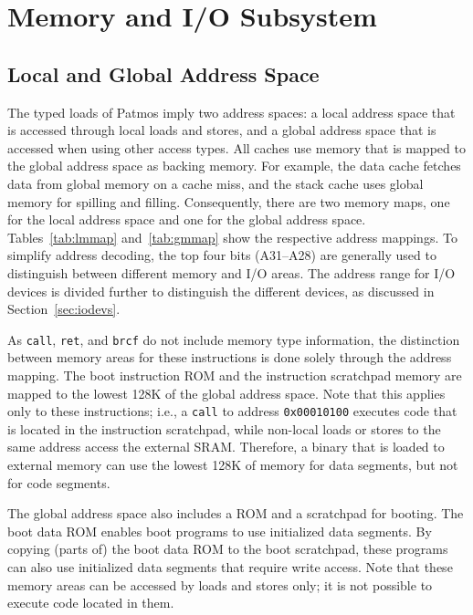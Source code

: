 \documentclass[a4paper,fontsize=10pt,twoside,DIV15,BCOR12mm,headinclude=true,footinclude=false,pagesize,bibtotoc]{scrbook}
\newcommand{\code}[1]{{\texttt{#1}}}
\begin{document}
\chapter{Memory and I/O Subsystem}
\label{chap:memsyst}

\section{Local and Global Address Space}

The typed loads of Patmos imply two address spaces: a local address
space that is accessed through local loads and stores, and a global
address space that is accessed when using other access types. All
caches use memory that is mapped to the global address space as
backing memory. For example, the data cache fetches data from global
memory on a cache miss, and the stack cache uses global memory for
spilling and filling. Consequently, there are two memory maps, one for
the local address space and one for the global address
space. Tables~\ref{tab:lmmap} and~\ref{tab:gmmap} show the respective
address mappings. To simplify address decoding, the top four bits
(A31--A28) are generally used to distinguish between different memory
and I/O areas. The address range for I/O devices is divided further to
distinguish the different devices, as discussed in
Section~\ref{sec:iodevs}.

As \code{call}, \code{ret}, and \code{brcf} do not include memory type
information, the distinction between memory areas for these
instructions is done solely through the address mapping. The boot instruction ROM
and the instruction scratchpad memory are mapped to the lowest 128K of
the global address space. Note that this applies only to these
instructions; i.e., a \code{call} to address \code{0x00010100}
executes code that is located in the instruction scratchpad, while
non-local loads or stores to the same address access the external
SRAM. Therefore, a binary that is loaded to external memory can use
the lowest 128K of memory for data segments, but not for code
segments.

The global address space also includes a ROM and a scratchpad for
booting. The boot data ROM enables boot programs to use initialized
data segments. By copying (parts of) the boot data ROM to the boot
scratchpad, these programs can also use initialized data segments that
require write access. Note that these memory areas can be accessed by
loads and stores only; it is not possible to execute code located in
them.
\end{document}

